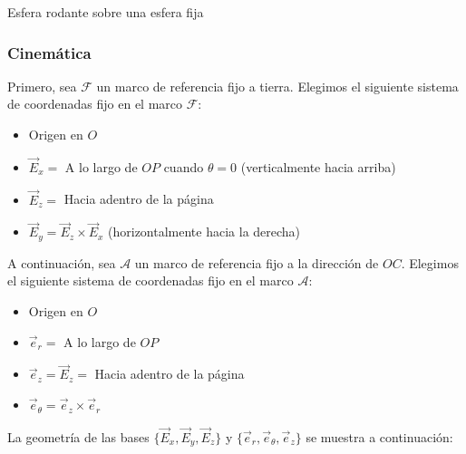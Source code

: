 \begin{solucion}{Esfera rodante sobre una esfera fija}
\subsubsection*{Cinemática}

Primero, sea $\mathcal{F}$ un marco de referencia fijo a tierra. Elegimos el siguiente sistema de coordenadas fijo en el marco $\mathcal{F}$:
\begin{itemize}
    \item Origen en $O$
    \item $\vec{E}_x =$ A lo largo de $OP$ cuando $\theta = 0$ (verticalmente hacia arriba)
    \item $\vec{E}_z =$ Hacia adentro de la página
    \item $\vec{E}_y = \vec{E}_z \times \vec{E}_x$ (horizontalmente hacia la derecha)
\end{itemize}

A continuación, sea $\mathcal{A}$ un marco de referencia fijo a la dirección de $OC$. Elegimos el siguiente sistema de coordenadas fijo en el marco $\mathcal{A}$:
\begin{itemize}
    \item Origen en $O$
    \item $\vec{e}_r =$ A lo largo de $OP$
    \item $\vec{e}_z = \vec{E}_z =$ Hacia adentro de la página
    \item $\vec{e}_\theta = \vec{e}_z \times \vec{e}_r$
\end{itemize}

La geometría de las bases $\{\vec{E}_x, \vec{E}_y, \vec{E}_z\}$ y $\{\vec{e}_r, \vec{e}_\theta, \vec{e}_z\}$ se muestra a continuación:

\begin{center}
\end{center}
\end{solucion}
